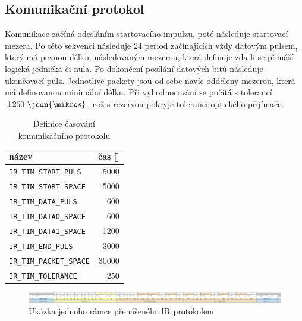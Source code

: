\subsection{Komunikační protokol}
Komunikace začíná odesláním startovacího impulzu, poté následuje startovací mezera. Po této sekvenci následuje 24 period začínajících vždy datovým pulsem, který má pevnou délku, následovaným mezerou, která definuje zda-li se přenáší logická jednička či nula. Po dokončení posílání datových bitů následuje ukončovací pulz. Jednotlivé packety jsou od sebe navíc odděleny mezerou, která má definovanou minimální délku. Při vyhodnocování se počítá s tolerancí $\pm250~\jedn{\mikro s}$, což s rezervou pokryje toleranci optického přijímače.

\begin{table}[H]
  \caption{Definice časování komunikačního protokolu}
  \begin{center}
  	\small
	  \begin{tabular}{|l|r|}
	    \hline
	    \textbf{název} & \textbf{čas [\jedn{\mikro s}]} \\\hline\hline
	    \texttt{IR\_TIM\_START\_PULS}       &  5000     \\\hline
	    \texttt{IR\_TIM\_START\_SPACE}      &  5000     \\\hline
	    \texttt{IR\_TIM\_DATA\_PULS}        &   600     \\\hline
	    \texttt{IR\_TIM\_DATA0\_SPACE}      &   600     \\\hline
        \texttt{IR\_TIM\_DATA1\_SPACE}      &  1200     \\\hline
        \texttt{IR\_TIM\_END\_PULS}         &  3000     \\\hline
        \texttt{IR\_TIM\_PACKET\_SPACE}     & 30000     \\\hline
        \texttt{IR\_TIM\_TOLERANCE}         &   250     \\\hline
	  \end{tabular}
  \end{center}
\end{table}

\begin{figure}[H]
    \begin{center}
        \includegraphics[width=\textwidth]{img/ir-protocol}
    \end{center}
    \caption{Ukázka jednoho rámce přenášeného IR protokolem}
\end{figure}

